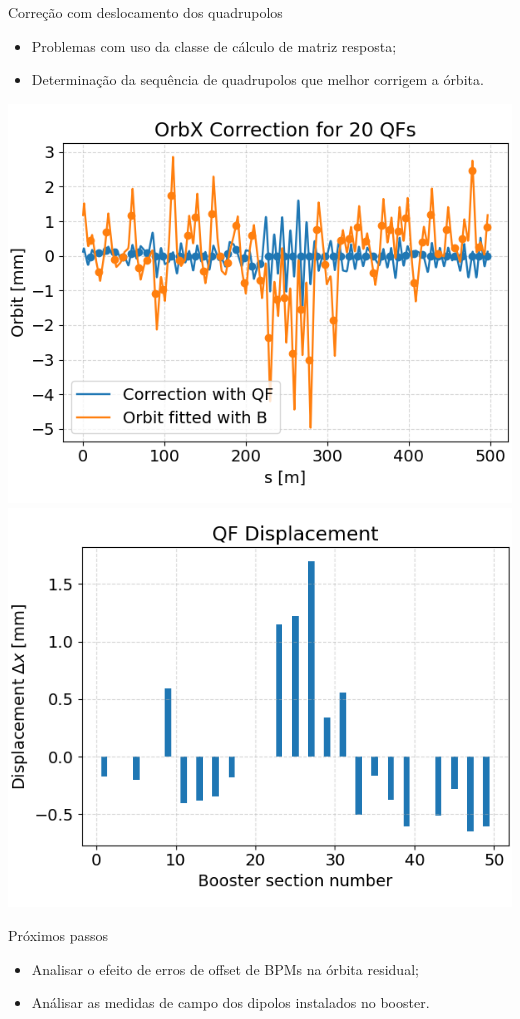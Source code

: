 \documentclass[aspectratio=169]{beamer}            %
\begin{document}
\begin{frame}{Correção com deslocamento dos quadrupolos}
    \begin{itemize}
        \item Problemas com uso da classe de cálculo de matriz resposta;
        \item Determinação da sequência de quadrupolos que melhor corrigem a órbita.
    \end{itemize}
    \begin{minipage}{\textwidth}
        \includegraphics[width=0.5\linewidth]{2024-05-31/figures/qf_orbit_correction.png}
        \includegraphics[width=0.5\linewidth]{2024-05-31/figures/qf_displacement.png}
    \end{minipage}
    Próximos passos
    \begin{itemize}
        \item Analisar o efeito de erros de offset de BPMs na órbita residual;
        \item Análisar as medidas de campo dos dipolos instalados no booster.
    \end{itemize}
\end{frame}
\end{document}
